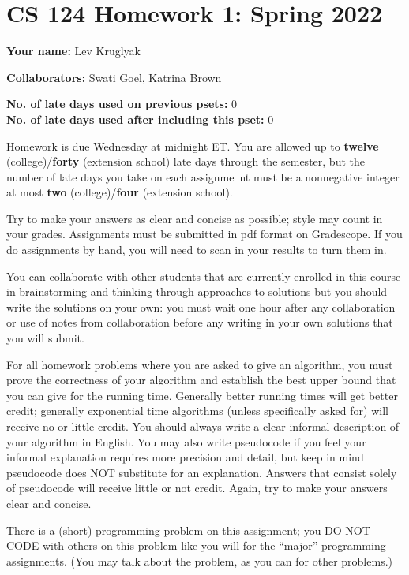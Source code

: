\documentclass[11pt, letterpaper]{article}
\begin{document}
\section*{CS 124 Homework 1: Spring 2022}

\textbf{Your name:} Lev Kruglyak

\textbf{Collaborators:} Swati Goel, Katrina Brown

\textbf{No. of late days used on previous psets: } 0\\
\textbf{No. of late days used after including this pset: }0

Homework is due Wednesday at midnight ET. You are allowed up to {\bf twelve} (college)/{\bf forty} (extension school) late days through the semester, but the number of late days you take on each assignme\
nt must be a nonnegative integer at most {\bf two} (college)/{\bf four} (extension school).

Try to make your answers as clear and concise as possible;
style may count in your grades. Assignments must be submitted in pdf format on Gradescope. If you do assignments by hand, you will need to scan in your results to turn them in.

You can collaborate with other students that are currently enrolled in this
course in brainstorming and thinking through approaches to solutions but you should write
the solutions on your own: you must wait one hour after any collaboration or use of notes
from collaboration before any writing in your own solutions that you will submit. 

For all homework problems where you are asked to give an algorithm, you must prove the correctness
of your algorithm and establish the best upper bound that you can give for the running time. Generally
better running times will get better credit; generally exponential time algorithms (unless specifically asked
for) will receive no or little credit. You should always write a clear informal description of your algorithm
in English. You may also write pseudocode if you feel your informal explanation requires more precision
and detail, but keep in mind pseudocode does NOT substitute for an explanation. Answers that consist
solely of pseudocode will receive little or not credit. Again, try to make your answers clear and concise.

There is a (short) programming problem on this assignment; you DO NOT CODE with others on
this problem like you will for the ``major'' programming assignments. (You may
talk about the problem, as you can for other problems.)
\end{document}
